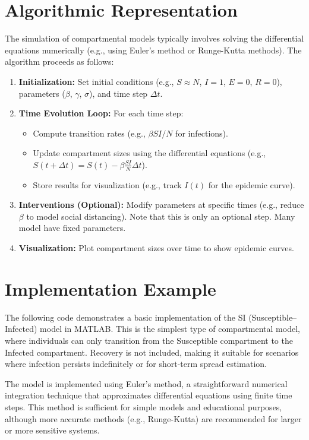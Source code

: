 \documentclass{article}
\begin{document}
\section{Algorithmic Representation}

The simulation of compartmental models typically involves solving the differential equations numerically (e.g., using Euler’s method or Runge-Kutta methods). The algorithm proceeds as follows:
\begin{enumerate}
    \item \textbf{Initialization:} Set initial conditions (e.g., $S \approx N$, $I = 1$, $E = 0$, $R = 0$), parameters ($\beta$, $\gamma$, $\sigma$), and time step $\Delta t$.
    \item \textbf{Time Evolution Loop:} For each time step:
        \begin{itemize}
            \item Compute transition rates (e.g., $\beta SI/N$ for infections).
            \item Update compartment sizes using the differential equations (e.g., $S(t + \Delta t) = S(t) - \beta \frac{SI}{N} \Delta t$).
            \item Store results for visualization (e.g., track $I(t)$ for the epidemic curve).
        \end{itemize}
    \item \textbf{Interventions (Optional):} Modify parameters at specific times (e.g., reduce $\beta$ to model social distancing). Note that this is only an optional step. Many model have fixed parameters. 
    \item \textbf{Visualization:} Plot compartment sizes over time to show epidemic curves.
\end{enumerate}

\section{ Implementation Example}
The following code demonstrates a basic implementation of the SI (Susceptible–Infected) model in MATLAB. This is the simplest type of compartmental model, where individuals can only transition from the Susceptible compartment to the Infected compartment. Recovery is not included, making it suitable for scenarios where infection persists indefinitely or for short-term spread estimation.

The model is implemented using Euler’s method, a straightforward numerical integration technique that approximates differential equations using finite time steps. This method is sufficient for simple models and educational purposes, although more accurate methods (e.g., Runge-Kutta) are recommended for larger or more sensitive systems.
\end{document}
